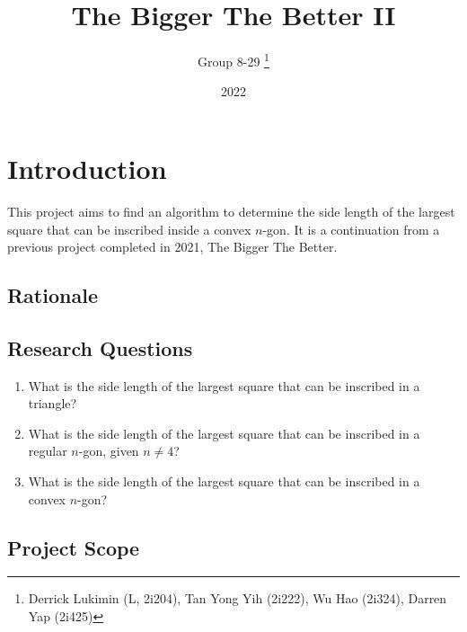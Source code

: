 \documentclass[12pt]{scrartcl}
\title{The Bigger The Better II}
\author{Group 8-29 \thanks{Derrick Lukimin (L, 2i204), Tan Yong Yih (2i222), Wu Hao (2i324), Darren Yap (2i425)}}
\date{2022}
\begin{document}
\onehalfspacing
\maketitle
\tableofcontents

\section{Introduction}
This project aims to find an algorithm to determine
the side length of the largest square that can be 
inscribed inside a convex $n$-gon. It is a continuation from
a previous project completed in 2021, The Bigger The Better. \cite{tbtb1}

\subsection{Rationale}

\subsection{Research Questions}
\begin{enumerate}
\item What is the side length of the largest square that can be inscribed in a triangle?
\item What is the side length of the largest square that can be inscribed in a regular $n$-gon, given $n \neq 4$?
\item What is the side length of the largest square that can be inscribed in a convex $n$-gon?
\end{enumerate}

\subsection{Project Scope}

\printbibliography
\end{document}
